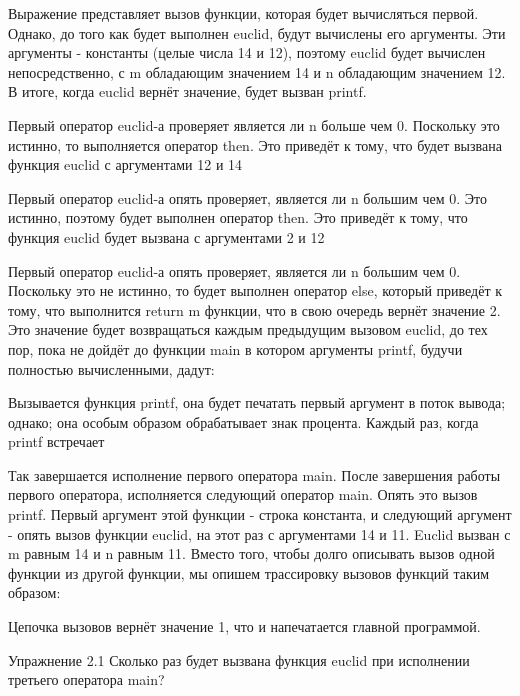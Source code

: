 Выражение представляет вызов функции, которая будет вычисляться первой. Однако, до того как будет выполнен euclid, будут вычислены его аргументы. Эти аргументы - константы (целые числа 14 и 12), поэтому euclid будет вычислен непосредственно, с m обладающим значением 14 и n обладающим значением 12. В итоге, когда euclid вернёт значение, будет вызван printf.

Первый оператор euclid-а проверяет является ли n больше чем 0. Поскольку это истинно, то выполняется оператор then. Это приведёт к тому, что будет вызвана функция euclid с аргументами 12 и 14%

Первый оператор euclid-а опять проверяет, является ли n большим чем 0. Это истинно, поэтому будет выполнен оператор then. Это приведёт к тому, что функция euclid будет вызвана с аргументами 2 и 12%

Первый оператор euclid-а опять проверяет, является ли n большим чем 0. Поскольку это не истинно, то будет выполнен оператор else, который приведёт к тому, что выполнится return m функции, что в свою очередь вернёт значение 2. Это значение будет возвращаться каждым предыдущим вызовом euclid, до тех пор, пока не дойдёт до функции main в котором аргументы printf, будучи полностью вычисленными, дадут:

Вызывается функция printf, она будет печатать первый аргумент в поток вывода; однако; она особым образом обрабатывает знак процента. Каждый раз, когда printf встречает %

Так завершается исполнение первого оператора main. После завершения работы первого оператора, исполняется следующий оператор main. Опять это вызов printf. Первый аргумент этой функции - строка константа, и следующий аргумент - опять вызов функции euclid, на этот раз с аргументами 14 и 11. Euclid вызван с m равным 14 и n равным 11. Вместо того, чтобы долго описывать вызов одной функции из другой функции, мы опишем трассировку вызовов функций таким образом:

Цепочка вызовов вернёт значение 1, что и напечатается главной программой.

Упражнение 2.1 Сколько раз будет вызвана функция euclid при исполнении третьего оператора main?

